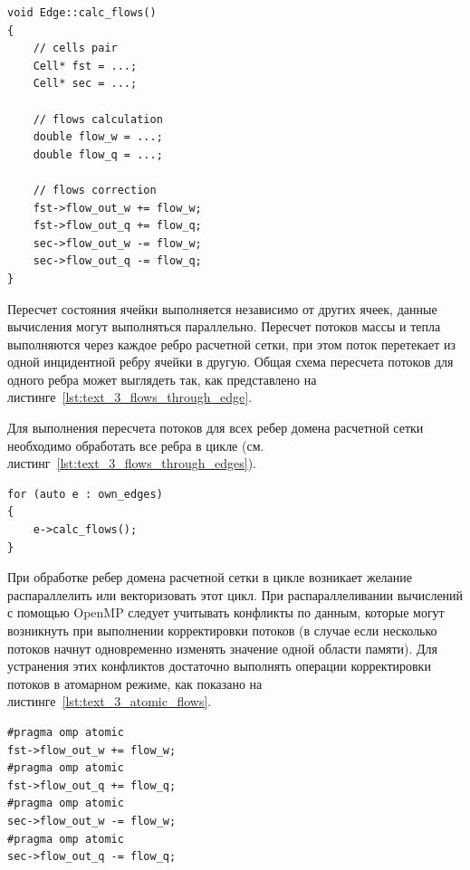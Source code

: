 \begin{lstlisting}[caption={Расчет протекания потоков через ребро сетки.}, label={lst:text_3_flows_through_edge}]
void Edge::calc_flows()
{
    // cells pair
    Cell* fst = ...;
    Cell* sec = ...;

    // flows calculation
    double flow_w = ...;
    double flow_q = ...;

    // flows correction
    fst->flow_out_w += flow_w;
    fst->flow_out_q += flow_q;
    sec->flow_out_w -= flow_w;
    sec->flow_out_q -= flow_q;
}
\end{lstlisting}

Пересчет состояния ячейки выполняется независимо от других ячеек, данные вычисления могут выполняться параллельно.
Пересчет потоков массы и тепла выполняются через каждое ребро расчетной сетки, при этом поток перетекает из одной инцидентной ребру ячейки в другую.
Общая схема пересчета потоков для одного ребра может выглядеть так, как представлено на листинге~\ref{lst:text_3_flows_through_edge}.

Для выполнения пересчета потоков для всех ребер домена\label{term:domain5} расчетной сетки необходимо обработать все ребра в цикле (см. листинг~\ref{lst:text_3_flows_through_edges}).

\begin{lstlisting}[caption={Расчет протекания потоков для всех ребер домена.}, label={lst:text_3_flows_through_edges}]
for (auto e : own_edges)
{
    e->calc_flows();
}
\end{lstlisting}

При обработке ребер домена расчетной сетки в цикле возникает желание распараллелить или векторизовать этот цикл.
При распараллеливании вычислений с помощью OpenMP\label{abbr:openmp2} следует учитывать конфликты по данным, которые могут возникнуть при выполнении корректировки потоков (в случае если несколько потоков начнут одновременно изменять значение одной области памяти).
Для устранения этих конфликтов достаточно выполнять операции корректировки потоков в атомарном режиме, как показано на листинге~\ref{lst:text_3_atomic_flows}.

\begin{lstlisting}[caption={Атомарные операции корректировки потоков.}, label={lst:text_3_atomic_flows}]
#pragma omp atomic
fst->flow_out_w += flow_w;
#pragma omp atomic
fst->flow_out_q += flow_q;
#pragma omp atomic
sec->flow_out_w -= flow_w;
#pragma omp atomic
sec->flow_out_q -= flow_q;
\end{lstlisting}

